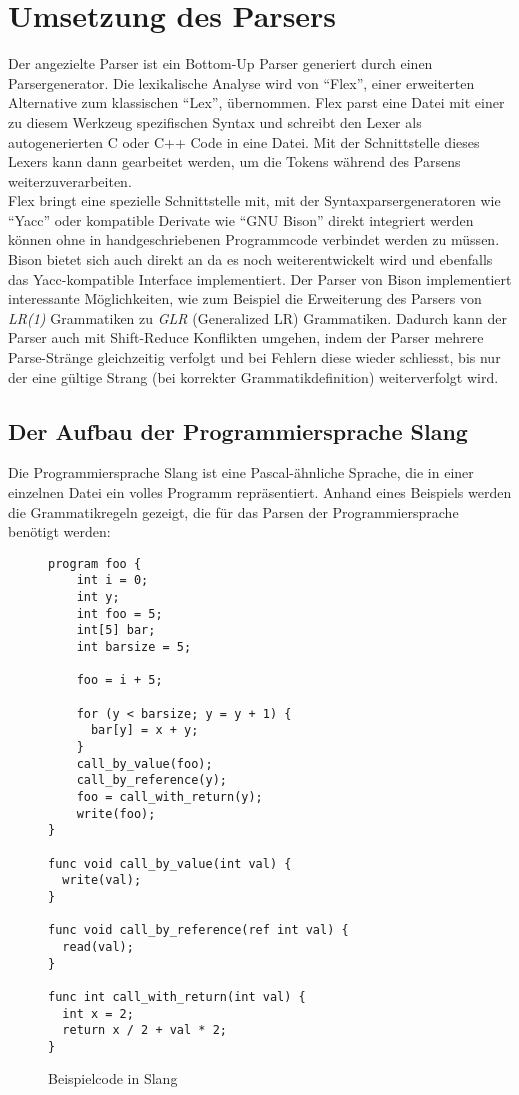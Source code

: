 \chapter{Umsetzung des Parsers}
\label{chap:building:parser}

Der angezielte Parser ist ein Bottom-Up Parser generiert durch einen Parsergenerator.
Die lexikalische Analyse wird von ``Flex'', einer erweiterten Alternative zum klassischen ``Lex'', übernommen.
Flex parst eine Datei mit einer zu diesem Werkzeug spezifischen Syntax und schreibt den Lexer als autogenerierten C oder C++ Code in eine Datei.
Mit der Schnittstelle dieses Lexers kann dann gearbeitet werden, um die Tokens während des Parsens weiterzuverarbeiten.\\
Flex bringt eine spezielle Schnittstelle mit, mit der Syntaxparsergeneratoren wie ``Yacc'' oder kompatible Derivate wie ``GNU Bison'' direkt integriert werden können ohne in handgeschriebenen Programmcode verbindet werden zu müssen\cite{flex:1995}.\\
Bison bietet sich auch direkt an da es noch weiterentwickelt wird und ebenfalls das Yacc-kompatible Interface implementiert.
Der Parser von Bison implementiert interessante Möglichkeiten, wie zum Beispiel die Erweiterung des Parsers von \textit{LR(1)} Grammatiken zu \textit{GLR} (Generalized LR) Grammatiken.
Dadurch kann der Parser auch mit Shift-Reduce Konflikten umgehen, indem der Parser mehrere Parse-Stränge gleichzeitig verfolgt und bei Fehlern diese wieder schliesst, bis nur der eine gültige Strang (bei korrekter Grammatikdefinition) weiterverfolgt wird\cite{bisonmanual}.\\

\section{Der Aufbau der Programmiersprache Slang}

Die Programmiersprache Slang ist eine Pascal-ähnliche Sprache, die in einer einzelnen Datei ein volles Programm repräsentiert.
Anhand eines Beispiels werden die Grammatikregeln gezeigt, die für das Parsen der Programmiersprache benötigt werden:

\begin{figure}[H]
  \begin{lstlisting}
program foo {
    int i = 0;
    int y;
    int foo = 5;
    int[5] bar;
    int barsize = 5;
    
    foo = i + 5;
    
    for (y < barsize; y = y + 1) {
      bar[y] = x + y;
    }
    call_by_value(foo);
    call_by_reference(y);
    foo = call_with_return(y);
    write(foo);
}

func void call_by_value(int val) {
  write(val);
}

func void call_by_reference(ref int val) {
  read(val);
}

func int call_with_return(int val) {
  int x = 2;
  return x / 2 + val * 2;
}
  \end{lstlisting}
  \caption{Beispielcode in Slang}
  \label{fig:slicc:slang}
\end{figure}

